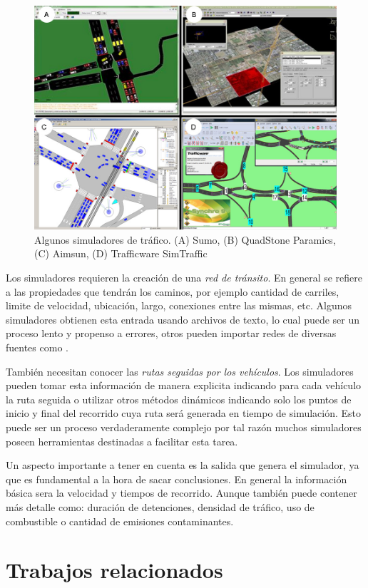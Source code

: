 \begin{figure}[H]
	\centering
	\includegraphics[width=0.9\linewidth]{Figures/simuladores}
	\caption[]{Algunos simuladores de tráfico. (A) Sumo, (B) QuadStone Paramics, (C) Aimsun, (D) Trafficware SimTraffic}
	\label{fig:simuladores}
\end{figure}

Los simuladores requieren la creación de una \emph{red de tránsito}. En general se refiere a las propiedades que tendrán los caminos, por ejemplo cantidad de carriles, limite de velocidad, ubicación, largo, conexiones entre las mismas, etc. Algunos simuladores obtienen esta entrada usando archivos de texto, lo cual puede ser un proceso lento y propenso a errores, otros pueden importar redes de diversas fuentes como \citet{OSM}.

También necesitan conocer las\emph{ rutas seguidas por los vehículos}. Los simuladores pueden tomar esta información de manera explicita indicando para cada vehículo la ruta seguida o utilizar otros métodos dinámicos indicando solo los puntos de inicio y final del recorrido cuya ruta será generada en tiempo de simulación. Esto puede ser un proceso verdaderamente complejo por tal razón muchos simuladores poseen herramientas destinadas a facilitar esta tarea.

Un aspecto importante a tener en cuenta es la salida que genera el simulador, ya que es fundamental a la hora de sacar conclusiones. En general la información básica sera la velocidad y tiempos de recorrido. Aunque también puede contener más detalle como: duración de detenciones, densidad de tráfico, uso de combustible o cantidad de emisiones contaminantes.  
 
\section{Trabajos relacionados}

